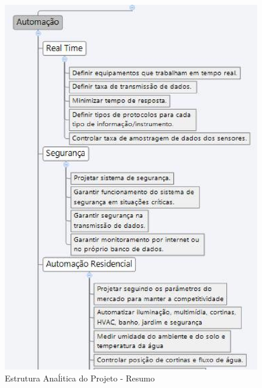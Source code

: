 \begin{figure}[H]
\centering
\includegraphics[keepaspectratio,scale=0.6]{figuras/EAP_automacao1.eps}
\caption{Estrutura Anaĺitica do Projeto - Resumo}
\end{figure}

